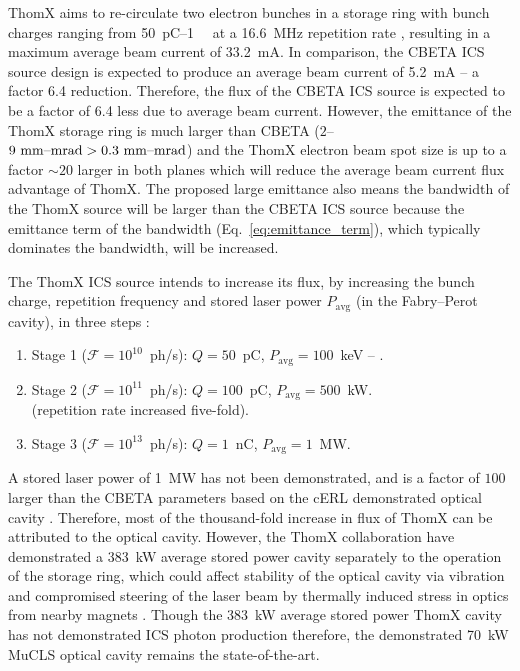 \documentclass[../main.tex]{subfiles}
\begin{document}
ThomX aims to re-circulate two electron bunches in a storage ring with bunch charges ranging from 50~\si{\pico\coulomb}--1~\si{\nano\coulom} at a 16.6~\si{\mega\hertz} repetition rate \cite{dupraz2020thomx}, resulting in a maximum average beam current of 33.2~\si{\milli\ampere}. In comparison, the CBETA ICS source design is expected to produce an average beam current of 5.2~\si{\milli\ampere} -- a factor 6.4 reduction. Therefore, the flux of the CBETA ICS source is expected to be a factor of 6.4 less due to average beam current. However, the emittance of the ThomX storage ring is much larger than CBETA ($2$--$9~\textrm{\si{\milli\meter}--\si{\milli\radian}} > 0.3~\textrm{\si{\milli\meter}--\si{\milli\radian}}$) and the ThomX electron beam spot size is up to a factor $\sim 20$ larger in both planes \cite{dupraz2020thomx} which will reduce the average beam current flux advantage of ThomX. The proposed large emittance also means the bandwidth of the ThomX source will be larger than the CBETA ICS source because the emittance term of the bandwidth (Eq.~\ref{eq:emittance_term}), which typically dominates the bandwidth, will be increased.  

The ThomX ICS source intends to increase its flux, by increasing the bunch charge, repetition frequency and stored laser power $P_{\mathrm{avg}}$ (in the Fabry--Perot cavity), in three steps \cite{dupraz2020thomx}: 
\begin{enumerate}
    \item{Stage 1 ($\mathcal{F}=10^{10}$~ph/\si{\second}): $Q=50$~\si{\pico\coulomb}, $P_{\mathrm{avg}}=100$~\si{\kilo\electronvolt} -- .}
    \item{Stage 2 ($\mathcal{F}=10^{11}$~ph/\si{\second}): $Q=100$~\si{\pico\coulomb}, $P_{\mathrm{avg}} = 500$~\si{\kilo\watt}. \\ (repetition rate increased five-fold).}
    \item{Stage 3 ($\mathcal{F}=10^{13}$~ph/\si{\second}): $Q=1$~\si{\nano\coulomb}, $P_{\mathrm{avg}} = 1$~\si{\mega\watt}.}
\end{enumerate}
A stored laser power of 1~\si{\mega\watt} has not  been demonstrated, and is a factor of $100$ larger than the CBETA parameters based on the cERL demonstrated optical cavity \cite{akagi2016narrow}. Therefore, most of the thousand-fold increase in flux of ThomX can be attributed to the optical cavity. However, the ThomX collaboration have demonstrated a 383~\si{\kilo\watt} average stored power cavity \cite{liu2018optical} separately to the operation of the storage ring, which could affect stability of the optical cavity via vibration and compromised steering of the laser beam by thermally induced
stress in optics from nearby magnets \cite{gunther2019device}.
Though the 383~\si{\kilo\watt} average stored power ThomX cavity has not demonstrated ICS photon production therefore, the demonstrated 70~\si{\kilo\watt} MuCLS \cite{eggl2016munich} optical cavity remains the state-of-the-art.
\end{document}
